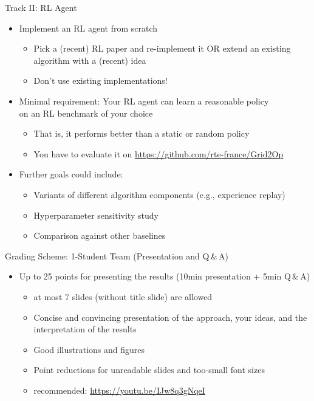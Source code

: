 \documentclass[aspectratio=169]{../latex_main/tntbeamer}  %
\begin{document}
\begin{frame}[c]{Track II: RL Agent}
	
	\begin{itemize}
		\item Implement an RL agent from scratch
		\begin{itemize}
		    \item Pick a (recent) RL paper and re-implement it OR extend an existing algorithm with a (recent) idea
			\item Don't use existing implementations!
		\end{itemize}
		\item Minimal requirement: Your RL agent can learn a reasonable policy\\ on an RL benchmark of your choice
		\begin{itemize}
			\item That is, it performs better than a static or random policy
			\item You have to evaluate it on \url{https://github.com/rte-france/Grid2Op}
		\end{itemize}
		\item Further goals could include:
		\begin{itemize}
			\item Variants of different algorithm components (e.g., experience replay)
			\item Hyperparameter sensitivity study
			\item Comparison against other baselines
		\end{itemize}
	\end{itemize}
	
\end{frame}
\begin{frame}[c]{Grading Scheme: 1-Student Team (Presentation and Q\,\&\,A)}

\begin{itemize}
\medskip
		\item Up to 25 points for presenting the results (10min presentation + 5min Q\,\&\,A)
            \begin{itemize}
                \item at most 7 slides (without title slide) are allowed
                \item Concise and convincing presentation of the approach, your ideas, and the interpretation of the results
                \item Good illustrations and figures
                \item Point reductions for unreadable slides and too-small font sizes
                \item recommended: \url{https://youtu.be/IJw8q3gNqeI}
            \end{itemize}
\end{itemize}
\end{frame}
\end{document}
